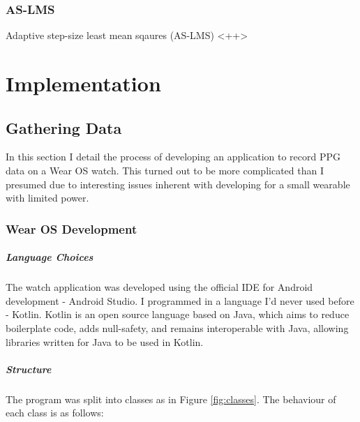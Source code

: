 \documentclass[12pt,a4paper,twoside,openright]{report}
\begin{document}
\subsection{AS-LMS}

Adaptive step-size least mean sqaures (AS-LMS) \cite{Ram12}<++> 



\chapter{Implementation}

\section{Gathering Data}

In this section I detail the process of developing an
application to record PPG data on a Wear OS watch. This turned out to be more
complicated than I presumed due to interesting issues inherent with developing for a small
wearable with limited power.

\subsection{Wear OS Development}

\paragraph{Language Choices}

The watch application was developed using the official IDE for Android
development - Android Studio. I programmed in a language I'd never used before
- Kotlin. Kotlin is an open source language based on Java, which aims to
reduce boilerplate code, adds null-safety, and remains interoperable with
Java, allowing libraries written for Java to be used in Kotlin.

\paragraph{Structure}

The program was split into classes as in Figure \ref{fig:classes}. The
behaviour of each class is as follows:
\end{document}
